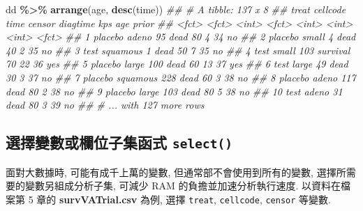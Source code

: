 \documentclass[
]{book}
\newenvironment{Shaded}{\begin{snugshade}}{\end{snugshade}}
\newcommand{\CommentTok}[1]{\textcolor[rgb]{0.56,0.35,0.01}{\textit{#1}}}
\newcommand{\KeywordTok}[1]{\textcolor[rgb]{0.13,0.29,0.53}{\textbf{#1}}}
\newcommand{\NormalTok}[1]{#1}
\newcommand{\OperatorTok}[1]{\textcolor[rgb]{0.81,0.36,0.00}{\textbf{#1}}}
\newcommand{\StringTok}[1]{\textcolor[rgb]{0.31,0.60,0.02}{#1}}
\begin{document}
\begin{Shaded}
\begin{Highlighting}[]
\NormalTok{dd }\OperatorTok{\%\textgreater{}\%}\StringTok{ }
\StringTok{  }\KeywordTok{arrange}\NormalTok{(age, }\KeywordTok{desc}\NormalTok{(time))}
\CommentTok{\#\# \# A tibble: 137 x 8}
\CommentTok{\#\#    treat   cellcode  time censor   diagtime   kps   age prior}
\CommentTok{\#\#    \textless{}fct\textgreater{}   \textless{}fct\textgreater{}    \textless{}int\textgreater{} \textless{}fct\textgreater{}       \textless{}int\textgreater{} \textless{}int\textgreater{} \textless{}int\textgreater{} \textless{}fct\textgreater{}}
\CommentTok{\#\#  1 placebo adeno       95 dead           80     4    34 no   }
\CommentTok{\#\#  2 placebo small        4 dead           40     2    35 no   }
\CommentTok{\#\#  3 test    squamous     1 dead           50     7    35 no   }
\CommentTok{\#\#  4 test    small      103 survival       70    22    36 yes  }
\CommentTok{\#\#  5 placebo large      100 dead           60    13    37 yes  }
\CommentTok{\#\#  6 test    large       49 dead           30     3    37 no   }
\CommentTok{\#\#  7 placebo squamous   228 dead           60     3    38 no   }
\CommentTok{\#\#  8 placebo adeno      117 dead           80     2    38 no   }
\CommentTok{\#\#  9 placebo large      103 dead           80     5    38 no   }
\CommentTok{\#\# 10 test    adeno       31 dead           80     3    39 no   }
\CommentTok{\#\# \# ... with 127 more rows}
\end{Highlighting}
\end{Shaded}

\hypertarget{ux9078ux64c7ux8b8aux6578ux6216ux6b04ux4f4dux5b50ux96c6ux51fdux5f0f-select}{%
\subsection{\texorpdfstring{選擇變數或欄位子集函式 \texttt{select()}}{選擇變數或欄位子集函式 select()}}\label{ux9078ux64c7ux8b8aux6578ux6216ux6b04ux4f4dux5b50ux96c6ux51fdux5f0f-select}}

面對大數據時, 可能有成千上萬的變數,
但通常部不會使用到所有的變數,
選擇所需要的變數另組成分析子集,
可減少 RAM 的負擔並加速分析執行速度.
以資料在檔案第 5 章的 \textbf{survVATrial.csv} 為例,
選擇 \texttt{treat}, \texttt{cellcode}, \texttt{censor} 等變數.
\end{document}
